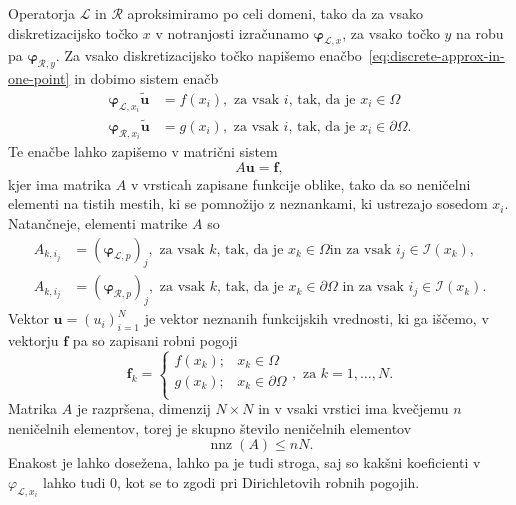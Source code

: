 \documentclass[12pt,a4paper,twoside]{article}
\theoremstyle{definition} %
\theoremstyle{plain} %
\numberwithin{equation}{section}
\newcommand{\Rc}{\mathcal{R}}
\newcommand{\I}{\mathcal{I}}
\renewcommand{\L}{\mathcal{L}}
\renewcommand{\b}{\boldsymbol}
\renewcommand{\phi}{\varphi}
\DeclareMathOperator{\nnz}{nnz}
\begin{document}
Operatorja $\L$ in $\Rc$ aproksimiramo po celi domeni, tako da za vsako diskretizacijsko točko $x$
v notranjosti izračunamo $\b\phi_{\L, x}$, za vsako točko $y$ na robu pa
$\b\phi_{\Rc, y}$. Za vsako diskretizacijsko točko napišemo
enačbo~\eqref{eq:discrete-approx-in-one-point} in dobimo sistem enačb
\begin{align}
  \b\phi_{\L, x_i} \b{\tilde{u}} &= f(x_i), \text{ za vsak $i$, tak, da je $x_i \in \Omega$ } \\
  \b\phi_{\Rc, x_i} \b{\tilde{u}} &= g(x_i), \text{ za vsak $i$, tak, da je $x_i \in \partial\Omega$.}
\end{align}
Te enačbe lahko zapišemo v matrični sistem
\begin{equation}
  A\b{u} = \b{f},
  \label{eq:discretized-system}
\end{equation}
kjer ima matrika $A$ v vrsticah zapisane funkcije oblike, tako da so neničelni elementi na tistih
mestih, ki se pomnožijo z neznankami, ki ustrezajo sosedom $x_i$. Natančneje, elementi matrike $A$
so
\begin{align}
  A_{k, i_j} &= (\b\phi_{\L, p})_j, \text{ za vsak $k$, tak, da je $x_k \in \Omega$
  in za vsak $i_j \in \I(x_k)$,} \\
  A_{k, i_j} &= (\b\phi_{\Rc, p})_j, \text{ za vsak $k$, tak, da je $x_k \in
  \partial\Omega$ in za vsak $i_j \in \I(x_k)$.}
\end{align}
Vektor $\b{u} = (u_i)_{i=1}^N$ je vektor neznanih funkcijskih vrednosti, ki ga
iščemo, v vektorju $\b{f}$ pa so zapisani robni pogoji
\begin{equation}
  \b f_k = \begin{cases}
    f(x_k); & x_k \in \Omega \\
    g(x_k); & x_k \in \partial\Omega \\
  \end{cases}, \text{ za $k = 1, \ldots, N$}.
\end{equation}
Matrika $A$ je razpršena, dimenzij $N\times N$ in v vsaki vrstici ima kvečjemu $n$ neničelnih
elementov, torej je skupno število neničelnih elementov
\begin{equation}
   \nnz(A) \leq nN.
\end{equation}
Enakost je lahko dosežena, lahko pa je tudi stroga, saj so kakšni koeficienti v $\phi_{\L, x_i}$ lahko
tudi 0, kot se to zgodi pri Dirichletovih robnih pogojih.
\end{document}
